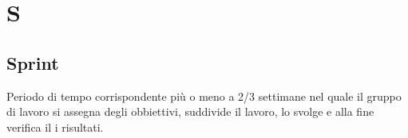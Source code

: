 \section{S}
\subsection{Sprint}%
Periodo di tempo corrispondente più o meno a 2/3 settimane nel quale il gruppo di lavoro si assegna degli obbiettivi, suddivide il lavoro, lo svolge e alla fine verifica il i risultati.

\clearpage